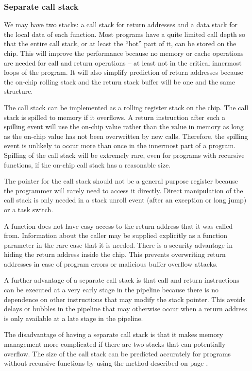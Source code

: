\documentclass[forwardcom.tex]{subfiles}
\begin{document}
\subsubsection{Separate call stack} \label{dualStack}
We may have two stacks: 
a call stack for return addresses and a data stack for the local data of each function. Most programs have a quite limited call depth so that the entire call stack, or at least the ``hot'' part of it, can be stored on the chip. This will improve the performance because no memory or cache operations are needed for call and return operations -- at least not in the critical innermost loops of the program. It will also simplify prediction of return addresses because the on-chip rolling stack and the return stack buffer will be one and the same structure.
\vv

The call stack can be implemented as a rolling register stack on the chip. The call stack is spilled to memory if it overflows. A return instruction after such a spilling event will use the on-chip value rather than the value in memory as long as the on-chip value has not been overwritten by new calls. Therefore, the spilling event is unlikely to occur more than once in the innermost part of a program. 
Spilling of the call stack will be extremely rare, even for programs with recursive functions, if the on-chip call stack has a reasonable size.
\vv

The pointer for the call stack should not be a general purpose register because the programmer will rarely need to access it directly. Direct manipulation of the call stack is only needed in a stack unroll event (after an exception or long jump) or a task switch.
\vv

A function does not have easy access to the return address that it was called from. Information about the caller may be supplied explicitly as a function parameter in the rare case that it is needed. There is a security advantage in hiding the return address inside the chip. This prevents overwriting return addresses in case of program errors or malicious buffer overflow attacks.
\vv

A further advantage of a separate call stack is that call and return instructions can be executed at a very early stage in the pipeline because there is no dependence on other instructions that may modify the stack pointer. This avoids delays or bubbles in the pipeline that may otherwise occur when a return address is only available at a late stage in the pipeline.
\vv

The disadvantage of having a separate call stack is that it makes memory management more complicated if there are two stacks that can potentially overflow. The size of the call stack can be predicted accurately for programs without recursive functions by using the method described on page \pageref{predictingStackSize}.
\vv
\end{document}
